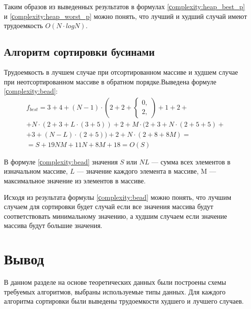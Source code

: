 Таким образов из выведенных результатов в формулах \ref{сomplexity:heap_best_p} и \ref{сomplexity:heap_worst_p} можно понять, что лучший и худший случай имеют трудоемкость $O(N \cdot log N)$.

\subsection{Алгоритм сортировки бусинами}

Трудоемкость в лучшем случае при отсортированном массиве и худшем случае при неотсортированном массиве в обратном порядке.Выведена формуле \ref{сomplexity:bead}:
\begin{equation}
	\label{сomplexity:bead}
	\begin{aligned}
		f_{best} = 3 + 4 + (N - 1) \cdot (2 + 2 + 
		\begin{cases}
			0, \\
			2,
		\end{cases}) 
		+ 1 + 2 + \\
		+ N \cdot (2 + 3 + L \cdot (3 + 5)) + 2 + M \cdot (2 + 3 + N \cdot (2 + 5 + 5) + \\
		+3 + (N - L) \cdot (2 + 5)) + 2 + N \cdot (2 + 8 + 8M) = \\
		= S + 19NM + 11N + 8M + 18 = O(S)
	\end{aligned}
\end{equation}

В формуле \ref{сomplexity:bead} значения $S$ или $NL$ --- сумма всех элементов в изначальном массиве, $L$ --- значение каждого элемента в массиве,  M --- максимальное значение из элементов в массиве.

Исходя из результата формулы \ref{сomplexity:bead} можно понять, что лучшим случаем для сортировки будет случай если все значения массива будут соответствовать минимальному значению, а худшим случаем если значение массива будут большие значения. 

\section{Вывод}

В данном разделе на основе теоретических данных были построены схемы
требуемых алгоритмов, выбраны используемые типы данных. Для каждого алгоритма сортировки были выведены трудоемкости худшего и лучшего случаев.